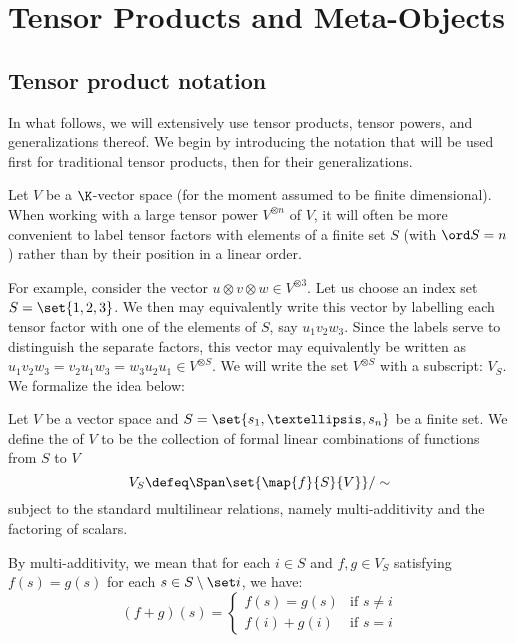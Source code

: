 \chapter{Tensor Products and Meta-Objects}
\label{ch:intro}

\section{Tensor product notation}
In what follows, we will extensively use tensor products, tensor powers, and
generalizations thereof. We begin by introducing the notation that will be used
first for traditional tensor products, then for their generalizations.

Let $V$ be a $\K$-vector space (for the moment assumed to be finite
dimensional). When working with a large tensor power $V^{\otimes n}$ of $V$, it
will often be more convenient to label tensor factors with elements of a finite
set $S$ (with $\ord S = n$) rather than by their position in a linear order.

For example, consider the vector $u \otimes v \otimes w \in V^{\otimes 3}$. Let
us choose an index set $S = \set{1,2,3}$. We then may equivalently write this
vector by labelling each tensor factor with one of the elements of $S$, say
$u_1v_2w_3$. Since the labels serve to distinguish the separate factors, this
vector may equivalently be written as $u_1v_2w_3 = v_2u_1w_3 = w_3u_2u_1 \in
V^{\otimes S}$. We will write the set $V^{\otimes S}$ with a subscript: $V_S$.
We formalize the idea below:

\begin{definition}
        Let $V$ be a vector space and $S = \set{s_1,…, s_n}$ be a finite
        set. We define the  of $V$ to be the
        collection of formal linear combinations of functions from $S$ to $V$
        \begin{equation}\label{eq:indexed_tensor}
                V_S \defeq \Span\set{\map {f} {S} {V}}/\sim
        \end{equation}
        subject to the standard multilinear relations, namely multi-additivity
        and the factoring of scalars.

        By multi-additivity, we mean that for each $i\in S$ and $f, g \in V_S$
        satisfying $f(s) = g(s)$ for each $s \in S\setminus\set i$, we have:
        \begin{equation}
                \label{eq:tensor_additive}
                (f + g)(s) =
                        \begin{cases}
                                f(s) = g(s) & \text{if $s \neq i$}\\
                                f(i) + g(i) & \text{if $s = i$}
                        \end{cases}
        \end{equation}
\end{definition}

